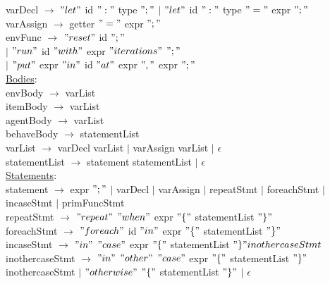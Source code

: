 \documentclass{article}
\begin{document}
varDecl $\rightarrow$ $"let"$ id $":"$ type $";"$ $\vert$ $"let"$ id $":"$ type $"="$ expr $";"$ \\

varAssign $\rightarrow$ getter $"="$ expr $";"$ \\

envFunc $\rightarrow$ $"reset"$ id $";"$ \\
$\vert$ $"run"$ id $"with"$ expr $"iterations"$ $";"$\\
$\vert$ $"put"$ expr $"in"$ id $"at"$ expr $","$ expr  $";"$\\

\underline{Bodies}: \\

envBody $\rightarrow$ varList \\

itemBody $\rightarrow$ varList \\

agentBody $\rightarrow$ varList \\

behaveBody $\rightarrow$ statementList \\

varList $\rightarrow$ varDecl varList $\vert$ varAssign varList $\vert$ $\epsilon$ \\

statementList $\rightarrow$ statement statementList $\vert$ $\epsilon$ \\

\underline{Statements}: \\

statement $\rightarrow$ expr $";"$ $\vert$ varDecl $\vert$ varAssign $\vert$ repeatStmt $\vert$ foreachStmt $\vert$ incaseStmt $\vert$ primFuncStmt \\

repeatStmt $\rightarrow$ $"repeat"$ $"when"$ expr $"\{"$ statementList  $"\}"$ \\

foreachStmt $\rightarrow$ $"foreach"$ id $"in"$ expr $"\{"$ statementList  $"\}"$ \\

incaseStmt $\rightarrow$  $"in"$  $"case"$ expr $"\{"$ statementList  $"\}" inothercaseStmt$\\

inothercaseStmt $\rightarrow$  $"in"$ $"other"$  $"case"$ expr $"\{"$ statementList  $"\}"$ inothercaseStmt $\vert$ $"otherwise"$ $"\{"$ statementList  $"\}"$ $\vert$ $\epsilon$ \\  
\end{document}
